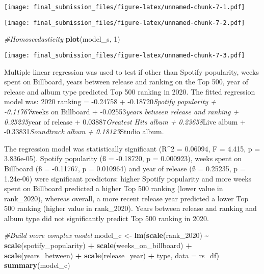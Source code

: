 \documentclass[
]{article}
\newenvironment{Shaded}{\begin{snugshade}}{\end{snugshade}}
\newcommand{\AttributeTok}[1]{\textcolor[rgb]{0.13,0.29,0.53}{#1}}
\newcommand{\CommentTok}[1]{\textcolor[rgb]{0.56,0.35,0.01}{\textit{#1}}}
\newcommand{\DecValTok}[1]{\textcolor[rgb]{0.00,0.00,0.81}{#1}}
\newcommand{\FunctionTok}[1]{\textcolor[rgb]{0.13,0.29,0.53}{\textbf{#1}}}
\newcommand{\NormalTok}[1]{#1}
\newcommand{\OtherTok}[1]{\textcolor[rgb]{0.56,0.35,0.01}{#1}}
\newcommand{\SpecialCharTok}[1]{\textcolor[rgb]{0.81,0.36,0.00}{\textbf{#1}}}
\begin{document}
\texttt{[image: final\_submission\_files/figure-latex/unnamed-chunk-7-1.pdf]}

\begin{Shaded}
\end{Shaded}

\texttt{[image: final\_submission\_files/figure-latex/unnamed-chunk-7-2.pdf]}

\begin{Shaded}
\begin{Highlighting}[]
\CommentTok{\#Homoscedasticity}
\FunctionTok{plot}\NormalTok{(model\_s, }\DecValTok{1}\NormalTok{)}
\end{Highlighting}
\end{Shaded}

\texttt{[image: final\_submission\_files/figure-latex/unnamed-chunk-7-3.pdf]}

Multiple linear regression was used to test if other than Spotify
popularity, weeks spent on Billboard, years between release and ranking
on the Top 500, year of release and album type predicted Top 500 ranking
in 2020. The fitted regression model was: 2020 ranking = -0.24758 +
-0.18720\emph{Spotify popularity + -0.11767}weeks on Billboard +
-0.02553\emph{years between release and ranking + 0.25235}year of
release + 0.03887\emph{Greatest Hits album + 0.23658}Live album +
-0.33831\emph{Soundtrack album + 0.18123}Studio album.

The regression model was statistically significant (R\^{}2 = 0.06094, F
= 4.415, p = 3.836e-05). Spotify popularity (ß = -0.18720, p =
0.000923), weeks spent on Billboard (ß = -0.11767, p = 0.010964) and
year of release (ß = 0.25235, p = 1.24e-06) were significant predictors:
higher Spotify popularity and more weeks spent on Billboard predicted a
higher Top 500 ranking (lower value in rank\_2020), whereas overall, a
more recent release year predicted a lower Top 500 ranking (higher value
in rank\_2020). Years between release and ranking and album type did not
significantly predict Top 500 ranking in 2020.

\begin{Shaded}
\begin{Highlighting}[]
\CommentTok{\#Build more complex model}
\NormalTok{model\_c }\OtherTok{\textless{}{-}} \FunctionTok{lm}\NormalTok{(}\FunctionTok{scale}\NormalTok{(rank\_2020) }\SpecialCharTok{\textasciitilde{}} \FunctionTok{scale}\NormalTok{(spotify\_popularity) }\SpecialCharTok{+} \FunctionTok{scale}\NormalTok{(weeks\_on\_billboard) }\SpecialCharTok{+} \FunctionTok{scale}\NormalTok{(years\_between) }\SpecialCharTok{+} \FunctionTok{scale}\NormalTok{(release\_year) }\SpecialCharTok{+}\NormalTok{ type, }\AttributeTok{data =}\NormalTok{ rs\_df)}
\FunctionTok{summary}\NormalTok{(model\_c)}
\end{Highlighting}
\end{Shaded}
\end{document}
